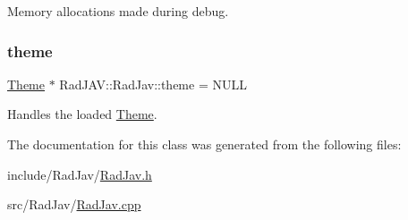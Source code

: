 Memory allocations made during debug. 

\mbox{\label{class_rad_j_a_v_1_1_rad_jav_ace6c4f9cb9d0d9c248986feeea31150e}} 
\subsubsection{\texorpdfstring{theme}{theme}}
{\footnotesize\ttfamily \mbox{\hyperlink{class_rad_j_a_v_1_1_theme}{Theme}} $\ast$ Rad\+J\+A\+V\+::\+Rad\+Jav\+::theme = N\+U\+LL\hspace{0.3cm}{\ttfamily [static]}}



Handles the loaded \mbox{\hyperlink{class_rad_j_a_v_1_1_theme}{Theme}}. 



The documentation for this class was generated from the following files\+:\begin{DoxyCompactItemize}
\item 
include/\+Rad\+Jav/\mbox{\hyperlink{_rad_jav_8h}{Rad\+Jav.\+h}}\item 
src/\+Rad\+Jav/\mbox{\hyperlink{_rad_jav_8cpp}{Rad\+Jav.\+cpp}}\end{DoxyCompactItemize}
